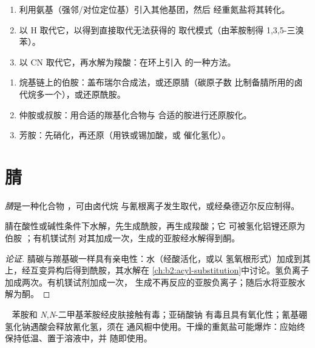 \begin{method}[经重氮盐的合成路线]\label{met:b2:amines:diazonium-routes}
\begin{enumerate}
  \item 利用氨基（强邻/对位定位基）引入其他基团，然后
        经重氮盐将其转化。
  \item 以 H 取代它，以得到直接取代无法获得的
        取代模式（由苯胺制得 1,3,5-三溴苯）。
  \item 以 CN 取代它，再水解为羧酸：在环上引入  的一种方法。
\end{enumerate}
\end{method}

\begin{method}[胺的制备]\label{met:b2:amines:make-amine}
\begin{enumerate}
  \item 烷基链上的伯胺：盖布瑞尔合成法，或还原腈（碳原子数
        比制备腈所用的卤代烷多一个），或还原酰胺。
  \item 仲胺或叔胺：用合适的羰基化合物与
        合适的胺进行还原胺化。
  \item 芳胺：先硝化，再还原（用铁或锡加酸，或
        催化氢化）。
\end{enumerate}
\end{method}

\section{腈}

\begin{definition}[腈]\label{def:b2:amines:nitrile}
\emph{腈}是一种化合物 ，可由卤代烷
与氰根离子发生取代，或经桑德迈尔反应制得。
\end{definition}

\begin{proposition}[腈的反应]\label{prop:b2:amines:nitrile}
腈在酸性或碱性条件下水解，先生成酰胺，再生成羧酸；它
可被氢化铝锂还原为伯胺 ；有机镁试剂
对其加成一次，生成的亚胺经水解得到酮。
\end{proposition}

\begin{proof}[论证]
腈碳与羰基碳一样具有亲电性：水（经酸活化，或以
氢氧根形式）加成到其上，经互变异构后得到酰胺，其水解在
\cref{ch:b2:acyl-substitution}中讨论。氢负离子加成两次。有机镁试剂加成一次，
生成不再反应的亚胺负离子；随后水将亚胺水解为酮。
\end{proof}

\begin{safety}{\,\,\,}
苯胺和 \textit{N},\textit{N}-二甲基苯胺经皮肤接触有毒；亚硝酸钠
有毒且具有氧化性；氰基硼氢化钠遇酸会释放氰化氢，须在
通风橱中使用。干燥的重氮盐可能爆炸：应始终保持低温、置于溶液中，并
随即使用。
\end{safety}

